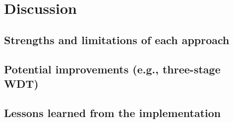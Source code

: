 
\chapter{Discussion}
\label{chap:discussion}

\section{Strengths and limitations of each approach}

\section{Potential improvements (e.g., three-stage WDT)}

\section{Lessons learned from the implementation}